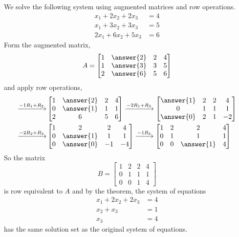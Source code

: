 \documentclass{ximera}
\begin{document}
\begin{example}
  We solve the following system using augmented matrices and row operations.
  \begin{align*}
    x_1+2x_2+2x_3&=4\\
    x_1+3x_2+3x_3&=5\\
    2x_1+6x_2+5x_3&=6
  \end{align*}
  Form the augmented matrix,
  \begin{align*}
    A=\begin{bmatrix}
      1&\answer{2}&2&4\\
      1&\answer{3}&3&5\\
      2&\answer{6}&5&6
    \end{bmatrix}
  \end{align*}
  and apply row operations,
  \begin{align*}
    \xrightarrow{\rowopadd{-1}{1}{2}}
    &
      \begin{bmatrix}
        1&\answer{2}&2&4\\
        0&\answer{1}&1&1\\
        2&6&5&6
      \end{bmatrix}
               \xrightarrow{\rowopadd{-2}{1}{3}}
               \begin{bmatrix}
                 \answer{1}&2&2&4\\
                 0&1&1&1\\
                 \answer{0}&2&1&-2
               \end{bmatrix}\\
    \xrightarrow{\rowopadd{-2}{2}{3}}
    &
      \begin{bmatrix}
        1&2&2&4\\
        0&\answer{1}&1&1\\
        0&\answer{0}&-1&-4
      \end{bmatrix}
                \xrightarrow{\rowopmult{-1}{3}}
                \begin{bmatrix}
                  1&2&2&4\\
                  0&1& 1&1\\
                  0&0&\answer{1}&4
                \end{bmatrix}
  \end{align*}
  So the matrix
\[
B=\begin{bmatrix}
1&2&2&4\\
0&1& 1&1\\
0&0&1&4
\end{bmatrix}
\]
is row equivalent to $A$
and by the theorem, the system of equations
\begin{align*}
x_1+2x_2+2x_3&=4\\
x_2+ x_3&=1\\
x_3&=4
\end{align*}
has the same solution set as the original system of equations.
\end{example}
\end{document}

